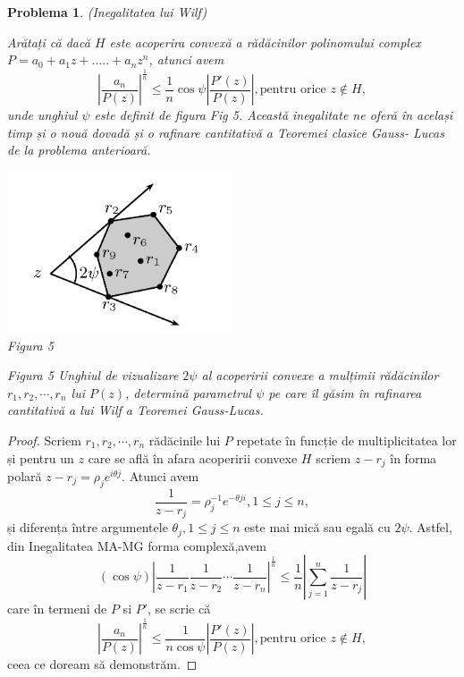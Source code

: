 \documentclass[a4paper,12pt,oneside]{report}
\newtheorem{problem}{Problema}
\begin{document}
\begin{problem} (Inegalitatea lui Wilf)

Arătați că dacă \(H\) este acoperira convexă a rădăcinilor polinomului complex \(P = a_{0} + a_{1}z + ..... +a_{n}z^{n}\), atunci avem
\begin{displaymath}
  \left | \frac{a_{n}}{P\left ( z \right )} \right |^{\frac{1}{n}}\leq \frac{1}n\cos{\psi }\left | \frac{{P}'\left ( z \right )}{P\left ( z \right )} \right | , \text{pentru orice } z\notin H, \label{eq:2.16} \tag{2.16}
\end{displaymath}
unde unghiul \(\psi\) este definit de figura Fig 5. Această inegalitate ne oferă în același timp și o nouă dovadă și o rafinare cantitativă  a Teoremei clasice Gauss- Lucas de la problema anterioară.
\begin{center}
	\includegraphics[width=0.5\textwidth]{fig_pb14.png}
	\\ Figura 5
\end{center}
Figura 5  Unghiul de vizualizare \(2\psi\) al acoperirii convexe a mulțimii rădăcinilor \(r_{1} , r_{2} , \cdots, r_{n}\)  lui \(P\left ( z \right )\), determină parametrul \(\psi\) pe care îl găsim în rafinarea cantitativă a lui Wilf a Teoremei Gauss-Lucas.
\end{problem}
\begin{proof}
Scriem \(r_{1} , r_{2} ,\cdots,r_{n}\) rădăcinile lui \(P\) repetate în funcție de multiplicitatea lor și pentru un \(z\) care se află în afara acoperirii convexe \(H\) scriem \(z - r_{j}\) în forma polară \(z - r_{j} = \rho _{j}e^{i\theta j}\). Atunci avem
\begin{displaymath}
  \frac{1}{z - r_{j}} = \rho _{j}^{-1}e^{-\theta ji} , 1 \leq  j \leq  n,
\end{displaymath}
și diferența între argumentele \(\theta _{j}, 1 \leq j\leq n\) este mai mică sau egală cu \(2\psi\). Astfel, din Inegalitatea  MA-MG forma complexă,avem
\begin{displaymath}
  \left ( \cos\psi  \right )\left | \frac{1}{z - r_{1}} \frac{1}{z - r_{2}}\cdots \frac{1}{z - r_{n}} \right|^{\frac{1}{n}} \leq  \frac{1}{n} \left | \sum_{j = 1}^{n}\frac{1}{z - r_{j}} \right |
\end{displaymath}
care în termeni de \(P\) si \({P}'\), se scrie că
\begin{displaymath}
   \left | \frac{a_{n}}{P\left ( z \right )} \right |^{\frac{1}{n}}\leq \frac{1}{n\cos\psi }\left | \frac{{P}'\left ( z \right )}{P\left ( z \right )} \right |,  \text{pentru orice }z \notin H,
\end{displaymath}
 ceea ce doream să demonstrăm.
\end{proof}
\end{document}
